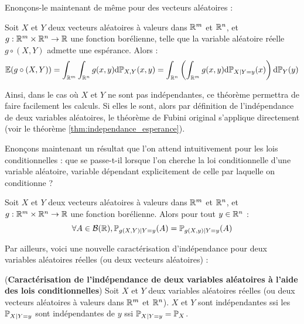 \documentclass[../integ-proba.tex]{subfiles}
\begin{document}
    Enonçons-le maintenant de même pour des vecteurs aléatoires :

    \begin{thm}
        Soit $X$ et $Y$ deux vecteurs aléatoires à valeurs dans $\mathbb{R}^m$ et $\mathbb{R}^n$, et $g : \mathbb{R}^m \times \mathbb{R}^n \rightarrow \mathbb{R}$ une fonction borélienne, telle que la variable aléatoire réelle $g \circ (X,Y)$ admette une espérance.
        Alors :
        \begin{displaymath}
            \mathbb{E}(g \circ (X,Y)) = \int_{\mathbb{R}^m} \int_{\mathbb{R}^n} g(x,y) \textnormal{d} \mathbb{P}_{X,Y} (x,y) = \int_{\mathbb{R}^n} \left( \int_{\mathbb{R}^m} g(x,y) \textnormal{d}\mathbb{P}_{X | Y=y} (x) \right) \textnormal{d} \mathbb{P}_Y (y)
        \end{displaymath}
    \end{thm}

    \begin{rem}
        Ainsi, dans le cas où $X$ et $Y$ ne sont pas indépendantes, ce théorème permettra de faire facilement les calculs.
        Si elles le sont, alors par définition de l'indépendance de deux variables aléatoires, le théorème de Fubini \og original \fg{} s'applique directement (voir le théorème \ref{thm:independance_esperance}).
    \end{rem}

    Enonçons maintenant un résultat que l'on attend intuitivement pour les lois conditionnelles : que se passe-t-il lorsque l'on cherche la loi conditionnelle d'une variable aléatoire, variable dépendant explicitement de celle par laquelle on conditionne ?

    \begin{thm}
        Soit $X$ et $Y$ deux vecteurs aléatoires à valeurs dans $\mathbb{R}^m$ et $\mathbb{R}^n$, et $g : \mathbb{R}^m \times \mathbb{R}^n \rightarrow \mathbb{R}$ une fonction borélienne.
        Alors pour tout $y \in \mathbb{R}^n$ :
        \begin{displaymath}
            \forall A \in \mathcal{B}(\mathbb{R}), \mathbb{P}_{g(X, Y) | Y = y}(A) = \mathbb{P}_{g(X, y) | Y = y}(A)
        \end{displaymath}
    \end{thm}

    Par ailleurs, voici une nouvelle caractérisation d'indépendance pour deux variables aléatoires réelles (ou deux vecteurs aléatoires) :

    \begin{thm}(\textbf{Caractérisation de l'indépendance de deux variables aléatoires à l'aide des lois conditionnelles})
        Soit $X$ et $Y$ deux variables aléatoires réelles (ou deux vecteurs aléatoires à valeurs dans $\mathbb{R}^m$ et $\mathbb{R}^n$).
        $X$ et $Y$ sont indépendantes ssi les $\mathbb{P}_{X | Y = y}$ sont indépendantes de $y$ ssi $\mathbb{P}_{X | Y = y} = \mathbb{P}_X$.
    \end{thm}
\end{document}
